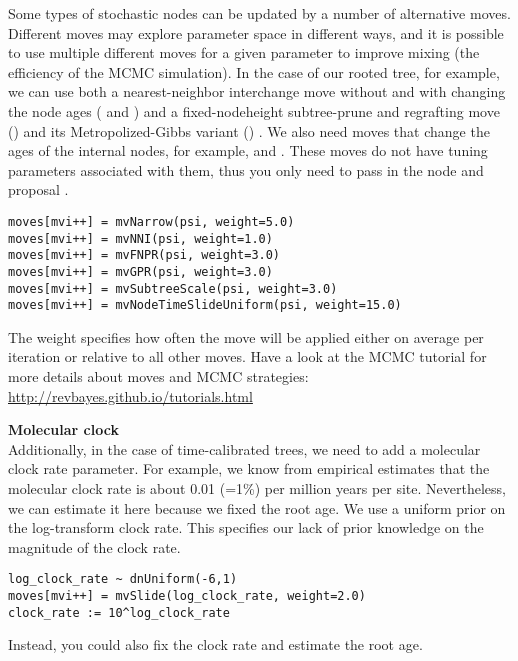 \begin{framed}
Some types of stochastic nodes can be updated by a number of alternative moves. 
Different moves may explore parameter space in different ways, and it is possible to use multiple different moves for a given parameter to improve mixing (the efficiency of the MCMC simulation). 
In the case of our rooted tree, for example, we can use both a nearest-neighbor interchange move without and with changing the node ages ( and ) and a fixed-nodeheight subtree-prune and regrafting move () and its Metropolized-Gibbs variant () \citep{Hoehna2008,Hoehna2012}. 
We also need moves that change the ages of the internal nodes, for example,  and .
These moves do not have tuning parameters associated with them, thus you only need to pass in the  node and proposal . 
{\tt \begin{snugshade*}
\begin{lstlisting}
moves[mvi++] = mvNarrow(psi, weight=5.0)
moves[mvi++] = mvNNI(psi, weight=1.0)
moves[mvi++] = mvFNPR(psi, weight=3.0)
moves[mvi++] = mvGPR(psi, weight=3.0)
moves[mvi++] = mvSubtreeScale(psi, weight=3.0)
moves[mvi++] = mvNodeTimeSlideUniform(psi, weight=15.0)
\end{lstlisting}
\end{snugshade*}}
The weight specifies how often the move will be applied either on average per iteration or relative to all other moves.
Have a look at the MCMC tutorial for more details about moves and MCMC strategies: \href{http://revbayes.github.io/tutorials.html}{http://revbayes.github.io/tutorials.html}
\vspace{0.3cm}

\textbf{Molecular clock}\\
Additionally, in the case of time-calibrated trees, we need to add a molecular clock rate parameter.
For example, we know from empirical estimates that the molecular clock rate is about  0.01 (=1\%) per million years per site.
Nevertheless, we can estimate it here because we fixed the root age.
We use a uniform prior on the log-transform clock rate.
This specifies our lack of prior knowledge on the magnitude of the clock rate.
{\tt \begin{snugshade*}
\begin{lstlisting}
log_clock_rate ~ dnUniform(-6,1)
moves[mvi++] = mvSlide(log_clock_rate, weight=2.0)
clock_rate := 10^log_clock_rate
\end{lstlisting}
\end{snugshade*}}

Instead, you could also fix the clock rate and estimate the root age.

\end{framed}


